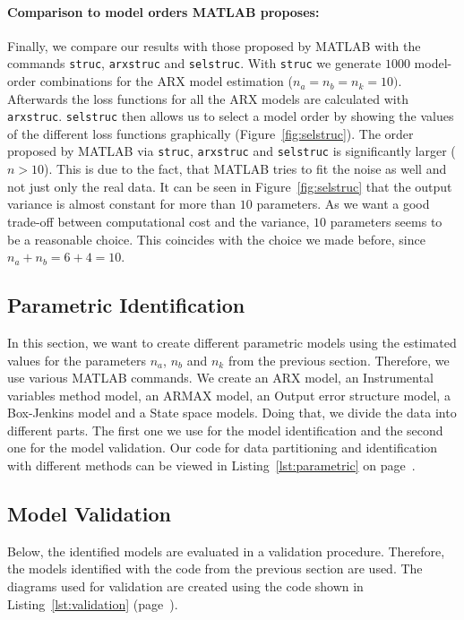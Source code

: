\paragraph{Comparison to model orders MATLAB proposes:} Finally, we compare our results with those proposed by MATLAB with the commands \texttt{struc}, \texttt{arxstruc} and \texttt{selstruc}. 
With \texttt{struc} we generate $1000$ model-order combinations for the ARX model estimation ($n_a = n_b = n_k = 10)$. Afterwards the loss functions for all the ARX models are calculated with \texttt{arxstruc}. \texttt{selstruc} then allows us to select a model order by showing the values of the different loss functions graphically (Figure~\ref{fig:selstruc}). 
The order proposed by MATLAB via \texttt{struc}, \texttt{arxstruc} and \texttt{selstruc} is significantly larger ($n > 10$). 
This is due to the fact, that MATLAB tries to fit the noise as well and not just only the real data. 
It can be seen in Figure~\ref{fig:selstruc} that the output variance is almost constant for more than $10$ parameters.
As we want a good trade-off between computational cost and the variance, $10$ parameters seems to be a reasonable choice.
This coincides with the choice we made before, since $n_a + n_b = 6 + 4 = 10$. 

\subsection{Parametric Identification}
In this section, we want to create different parametric models using the estimated values for the parameters $n_a$, $n_b$ and $n_k$ from the previous section. 
Therefore, we use various MATLAB commands. 
We create an ARX model, an Instrumental variables method model, an ARMAX model, an Output error structure model, a Box-Jenkins model and a State space models.
Doing that, we divide the data into different parts. 
The first one we use for the model identification and the second one for the model validation. 
Our code for data partitioning and identification with different methods can be viewed in Listing~\ref{lst:parametric} on page~\pageref{lst:parametric}.

\FloatBarrier
\subsection{Model Validation}
Below, the identified models are evaluated in a validation procedure.
Therefore, the models identified with the code from the previous section are used.
The diagrams used for validation are created using the code shown in Listing~\ref{lst:validation} (page~\pageref{lst:validation}).

